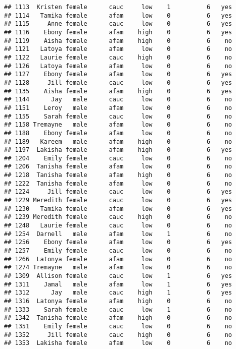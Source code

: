 \documentclass[
]{article}
\begin{document}
\begin{verbatim}
## 1113  Kristen female      cauc     low    1          6   yes
## 1114   Tamika female      afam     low    0          6   yes
## 1115     Anne female      cauc     low    0          6   yes
## 1116    Ebony female      afam    high    0          6   yes
## 1119    Aisha female      afam    high    0          6    no
## 1121   Latoya female      afam     low    0          6    no
## 1122   Laurie female      cauc    high    0          6    no
## 1126   Latoya female      afam     low    0          6    no
## 1127    Ebony female      afam     low    0          6   yes
## 1128     Jill female      cauc     low    0          6   yes
## 1135    Aisha female      afam    high    0          6   yes
## 1144      Jay   male      cauc     low    0          6    no
## 1151    Leroy   male      afam     low    0          6    no
## 1155    Sarah female      cauc     low    0          6    no
## 1158 Tremayne   male      afam     low    0          6    no
## 1188    Ebony female      afam     low    0          6    no
## 1189   Kareem   male      afam    high    0          6    no
## 1197  Lakisha female      afam    high    0          6   yes
## 1204    Emily female      cauc     low    0          6    no
## 1206  Tanisha female      afam     low    0          6    no
## 1218  Tanisha female      afam    high    0          6    no
## 1222  Tanisha female      afam     low    0          6    no
## 1224     Jill female      cauc     low    0          6   yes
## 1229 Meredith female      cauc     low    0          6   yes
## 1230   Tamika female      afam     low    0          6   yes
## 1239 Meredith female      cauc    high    0          6    no
## 1248   Laurie female      cauc     low    0          6    no
## 1254  Darnell   male      afam     low    1          6    no
## 1256    Ebony female      afam     low    0          6   yes
## 1257    Emily female      cauc     low    0          6    no
## 1266  Latonya female      afam     low    0          6    no
## 1274 Tremayne   male      afam     low    0          6    no
## 1309  Allison female      cauc     low    1          6   yes
## 1311    Jamal   male      afam     low    1          6   yes
## 1312      Jay   male      cauc    high    1          6   yes
## 1316  Latonya female      afam    high    0          6    no
## 1333    Sarah female      cauc     low    1          6    no
## 1342  Tanisha female      afam    high    0          6    no
## 1351    Emily female      cauc     low    0          6    no
## 1352     Jill female      cauc    high    0          6    no
## 1353  Lakisha female      afam     low    0          6    no

\end{verbatim}
\end{document}
